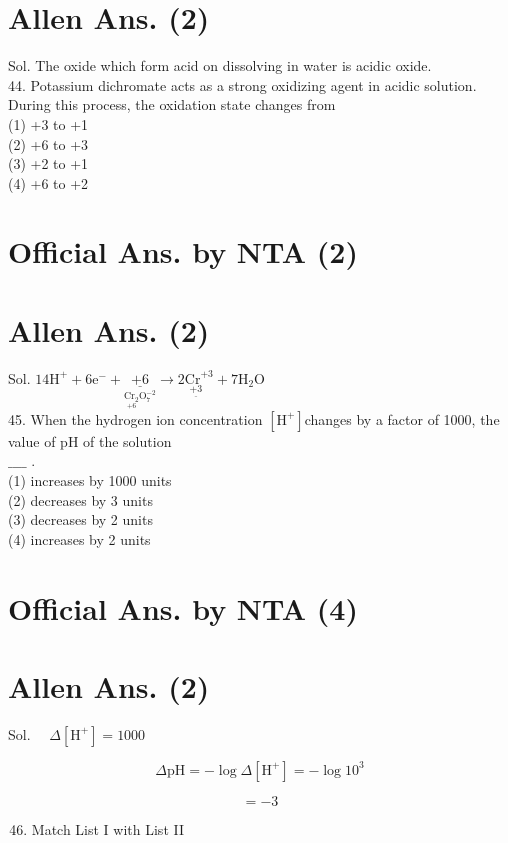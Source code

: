 \documentclass[10pt]{article}
\begin{document}
\section*{Allen Ans. (2)}
Sol. The oxide which form acid on dissolving in water is acidic oxide.\\
44. Potassium dichromate acts as a strong oxidizing agent in acidic solution. During this process, the oxidation state changes from\\
(1) +3 to +1\\
(2) +6 to +3\\
(3) +2 to +1\\
(4) +6 to +2

\section*{Official Ans. by NTA (2)}
\section*{Allen Ans. (2)}
Sol. \(14 \mathrm{H}^{+}+6 \mathrm{e}^{-}+\underset{\underset{+6}{\mathrm{Cr}_{2}} \mathrm{O}_{7}^{-2}}{\underline{+6}} \longrightarrow \underset{\underline{+3}}{2 \mathrm{Cr}^{+3}}+7 \mathrm{H}_{2} \mathrm{O}\)\\
45. When the hydrogen ion concentration \(\left[\mathrm{H}^{+}\right]\)changes by a factor of 1000, the value of pH of the solution\\
\(\_\_\_\_\) .\\
(1) increases by 1000 units\\
(2) decreases by 3 units\\
(3) decreases by 2 units\\
(4) increases by 2 units

\section*{Official Ans. by NTA (4)}
\section*{Allen Ans. (2)}
Sol. \(\quad \Delta\left[\mathrm{H}^{+}\right]=1000\)

\[
\Delta \mathrm{pH}=-\log \Delta\left[\mathrm{H}^{+}\right]=-\log 10^{3}
\]

\[
=-3
\]

\begin{enumerate}
  \setcounter{enumi}{45}
  \item Match List I with List II
\end{enumerate}
\end{document}
